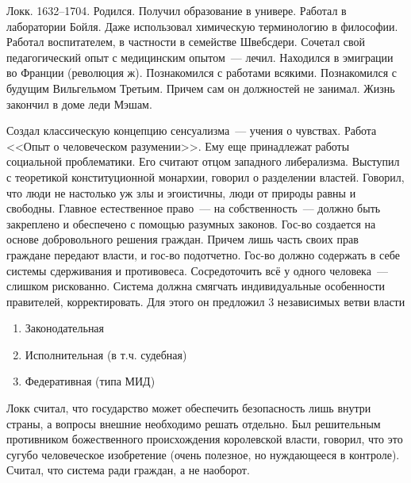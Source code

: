 Локк. 1632--1704.
Родился. Получил образование в универе. Работал в лаборатории Бойля. Даже использовал химическую терминологию в философии. Работал воспитателем, в частности в семействе Швебсдери.
Сочетал свой педагогический опыт с медицинским опытом~--- лечил. Находился в эмиграции во Франции (революция ж). Познакомился с работами всякими. Познакомился с будущим Вильгельмом Третьим. Причем сам он должностей не занимал. Жизнь закончил в доме леди Мэшам.

Создал классическую концепцию сенсуализма~--- учения о чувствах. Работа <<Опыт о человеческом разумении>>. Ему еще принадлежат работы социальной проблематики. Его считают отцом западного либерализма. Выступил с теоретикой конституционной монархии, говорил о разделении властей. Говорил, что люди не настолько уж злы и эгоистичны, люди от природы равны и свободны. Главное естественное право~--- на собственность~--- должно быть закреплено и обеспечено с помощью разумных законов. Гос-во создается на основе добровольного решения граждан. Причем лишь часть своих прав граждане передают власти, и гос-во подотчетно. Гос-во должно содержать в себе системы сдерживания и противовеса. Сосредоточить всё у одного человека~--- слишком рискованно. Система должна смягчать индивидуальные особенности правителей, корректировать. Для этого он предложил 3 независимых ветви власти
\begin{enumerate}
	\item Законодательная
	\item Исполнительная (в т.ч. судебная) 
	\item Федеративная (типа МИД) 
\end{enumerate}
	
Локк считал, что государство может обеспечить безопасность лишь внутри страны, а вопросы внешние необходимо решать отдельно. Был решительным противником божественного происхождения королевской власти, говорил, что это сугубо человеческое изобретение (очень полезное, но нуждающееся в контроле). Считал, что система ради граждан, а не наоборот.
